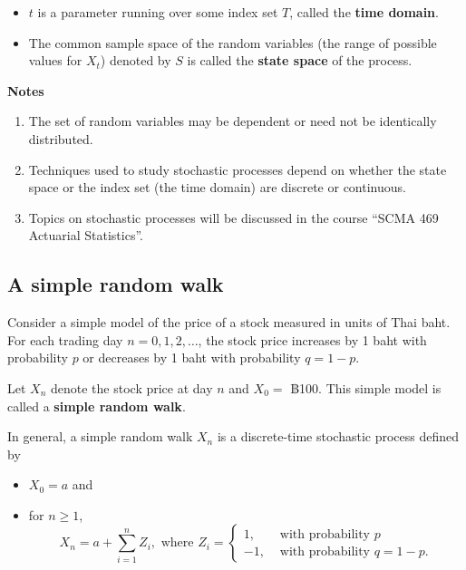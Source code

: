\documentclass[
]{book}
\theoremstyle{definition}
\theoremstyle{definition}
\theoremstyle{definition}
\theoremstyle{definition}
\theoremstyle{remark}
\begin{document}
\begin{itemize}
\item
  \(t\) is a parameter running over some index set \(T\), called the
  \textbf{time domain}.
\item
  The common sample space of the random variables (the range of
  possible values for \(X_t\)) denoted by \(S\) is called the \textbf{state
  space} of the process.
\end{itemize}

\textbf{Notes}

\begin{enumerate}
\def\labelenumi{\arabic{enumi}.}
\item
  The set of random variables may be dependent or need not be
  identically distributed.
\item
  Techniques used to study stochastic processes depend on whether the
  state space or the index set (the time domain) are discrete or
  continuous.
\item
  Topics on stochastic processes will be discussed in the course ``SCMA
  469 Actuarial Statistics''.
\end{enumerate}

\hypertarget{a-simple-random-walk}{%
\subsection{A simple random walk}\label{a-simple-random-walk}}

Consider a simple model of the price of a stock measured in units of
Thai baht. For each trading day \(n = 0,1,2, \ldots\), the stock price
increases by 1 baht with probability \(p\) or decreases by 1 baht with
probability \(q = 1-p\).

Let \(X_n\) denote the stock price at day \(n\) and \(X_0 =\) ฿100. This
simple model is called a \textbf{simple random walk}.

In general, a simple random walk \(X_n\) is a discrete-time stochastic
process defined by

\begin{itemize}
\item
  \(X_0 = a\) and
\item
  for \(n \ge1\),
  \[X_n = a + \sum_{i=1}^n  Z_i, \text{ where } Z_i = \begin{cases}
      1, & \text{ with probability } p  \\
      -1, & \text{ with probability } q =  1- p.
   \end{cases}\]
\end{itemize}
\end{document}
